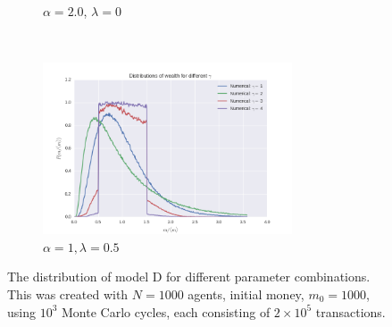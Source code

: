 \documentclass[a4paper, 10pt]{article}
\begin{document}
\begin{figure}[!ht]
\begin{subfigure}[H!]{0.5\textwidth}
        \caption{$\alpha = 2.0$, $\lambda=0$}\label{fig:ModelD_dist_3}
    \end{subfigure}%
    ~
       \begin{subfigure}[H!]{0.5\textwidth}
        \centering
        \includegraphics[height=2.0in]{distGammasA1L05.png}
        \caption{$\alpha = 1, \lambda=0.5$}\label{fig:ModelD_dist_4}
    \end{subfigure}
\caption{The distribution of model D for different parameter combinations. This was created with $N=1000$ agents, initial money, $m_0=1000$, using $10^3$ Monte Carlo cycles, each consisting of $2\times 10^5$ transactions.}\label{fig:ModelD_dist}
\end{figure}
\end{document}
